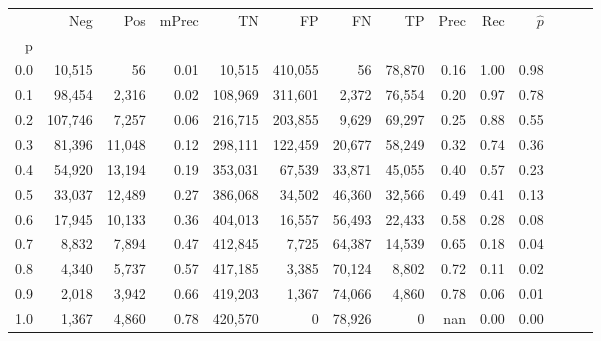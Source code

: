 \begin{tabular}{rrrrrrrrrrrrrr}
\toprule
{} &      Neg &     Pos & mPrec &       TN &       FP &      FN &      TP &  Prec &   Rec & $\hat{p}$ \\
p   &          &         &       &          &          &         &         &       &       &           \\
\midrule
0.0 &   10,515 &      56 &  0.01 &   10,515 &  410,055 &      56 &  78,870 &  0.16 &  1.00 &      0.98 \\
0.1 &   98,454 &   2,316 &  0.02 &  108,969 &  311,601 &   2,372 &  76,554 &  0.20 &  0.97 &      0.78 \\
0.2 &  107,746 &   7,257 &  0.06 &  216,715 &  203,855 &   9,629 &  69,297 &  0.25 &  0.88 &      0.55 \\
0.3 &   81,396 &  11,048 &  0.12 &  298,111 &  122,459 &  20,677 &  58,249 &  0.32 &  0.74 &      0.36 \\
0.4 &   54,920 &  13,194 &  0.19 &  353,031 &   67,539 &  33,871 &  45,055 &  0.40 &  0.57 &      0.23 \\
0.5 &   33,037 &  12,489 &  0.27 &  386,068 &   34,502 &  46,360 &  32,566 &  0.49 &  0.41 &      0.13 \\
0.6 &   17,945 &  10,133 &  0.36 &  404,013 &   16,557 &  56,493 &  22,433 &  0.58 &  0.28 &      0.08 \\
0.7 &    8,832 &   7,894 &  0.47 &  412,845 &    7,725 &  64,387 &  14,539 &  0.65 &  0.18 &      0.04 \\
0.8 &    4,340 &   5,737 &  0.57 &  417,185 &    3,385 &  70,124 &   8,802 &  0.72 &  0.11 &      0.02 \\
0.9 &    2,018 &   3,942 &  0.66 &  419,203 &    1,367 &  74,066 &   4,860 &  0.78 &  0.06 &      0.01 \\
1.0 &    1,367 &   4,860 &  0.78 &  420,570 &        0 &  78,926 &       0 &   nan &  0.00 &      0.00 \\
\bottomrule
\end{tabular}

